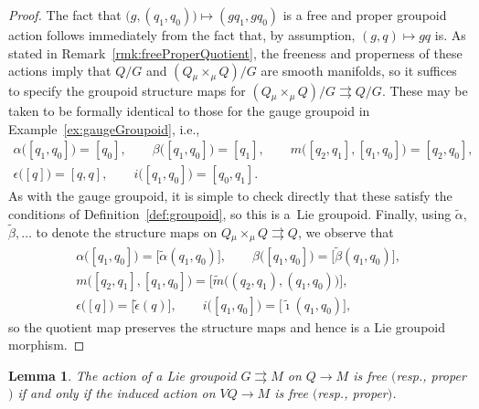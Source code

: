 \documentclass[10pt,a4paper]{amsart}
\numberwithin{equation}{section}
\newtheorem{Lemma}[Theorem]{Lemma}
\begin{document}
\begin{proof} The fact that $ \bigl( g, ( q _1 , q _0 )\bigr) \mapsto ( g q _1 , g q _0 ) $ is a free and proper groupoid action follows immediately from the fact that, by assumption, $ ( g, q) \mapsto g q $ is. As stated in Remark~\ref{rmk:freeProperQuotient}, the freeness and properness of these actions imply that $ Q / G $ and $ (Q \mathbin{ _\mu \times _\mu } Q)/G $ are smooth manifolds, so it suf\/f\/ices to specify the groupoid structure maps for $ (Q \mathbin{ _\mu \times _\mu } Q)/G \rightrightarrows Q / G $. These may be taken to be formally identical to those for the gauge groupoid in Example~\ref{ex:gaugeGroupoid}, i.e.,
 \begin{gather*}
 \alpha \bigl( [ q _1 , q _0 ] \bigr) = [q _0] , \qquad \beta \bigl( [ q _1, q _0 ] \bigr) = [q _1] , \qquad m \bigl( [q _2 , q
 _1 ] , [ q _1 , q _0 ] \bigr) = [ q _2 , q _0 ] ,\\
 \epsilon \bigl( [q] \bigr) = [ q, q ] , \qquad i \bigl( [ q _1 , q _0] \bigr) = [q _0, q _1].
 \end{gather*}
As with the gauge groupoid, it is simple to check directly that these satisfy the conditions of Def\/inition~\ref{def:groupoid}, so this is a~Lie groupoid. Finally, using $ \widetilde{ \alpha } $, $ \widetilde{ \beta } , \ldots $ to denote the structure maps on $ Q \mathbin{ _\mu \times _\mu } Q \rightrightarrows Q $, we observe that
 \begin{gather*}
\alpha \bigl( [ q _1 , q _0 ] \bigr) = \bigl[ \widetilde{ \alpha } ( q _1, q _0 ) \bigr] , \qquad \beta \bigl( [ q _1, q _0 ] \bigr) = \bigl[
\widetilde{ \beta } ( q _1, q _0 ) \bigr] , \\
 m \bigl( [q _2 , q _1 ] , [ q _1 , q _0 ] \bigr) = \bigl[ \widetilde{ m } \bigl((q _2, q _1), (q_1, q _0 ) \bigr) \bigr] ,\\
\epsilon \bigl( [q] \bigr) = \bigl[ \widetilde{ \epsilon } (q) \bigr] , \qquad i \bigl( [ q _1 , q _0] \bigr) = \bigl[\widetilde{ \imath } (q _1, q _0 ) \bigr] ,
 \end{gather*}
so the quotient map preserves the structure maps and hence is a Lie groupoid morphism.
\end{proof}

\begin{Lemma} \label{lem:freeProper}
The action of a Lie groupoid $ G \rightrightarrows M $ on $Q \rightarrow M$ is free $($resp., proper$)$ if and only if the induced action on $ V Q \rightarrow M $ is free $($resp., proper$)$.
\end{Lemma}
\end{document}
